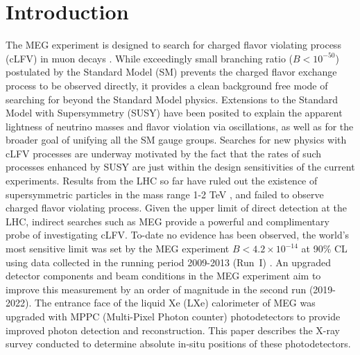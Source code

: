 \section{\label{intro}Introduction}
The MEG experiment is designed to search for charged flavor violating
\mueg process (cLFV) in muon decays \cite{megexperiment}.  While
exceedingly small branching ratio ($B < 10^{-50}$) postulated by the
Standard Model (SM) prevents the charged flavor exchange process to be
observed directly, it provides a clean background free mode of
searching for beyond the Standard Model physics.  Extensions to the
Standard Model with Supersymmetry (SUSY) have been posited to explain
the apparent lightness of neutrino masses and flavor violation via
oscillations, as well as for the broader goal of unifying all the SM
gauge groups. Searches for new physics with cLFV processes are
underway motivated by the fact that the rates of such processes
enhanced by SUSY are just within the design sensitivities of the
current experiments.  Results from the LHC so far have ruled out the
existence of supersymmetric particles in the mass range 1-2 TeV
\cite{lhcsusy1,lhcsusy2}, and failed to observe charged flavor violating
process\cite{lhcclfv1,lhcclfv2}.  Given the upper limit of
direct detection at the LHC, indirect searches such as MEG provide a
powerful and complimentary probe of investigating cLFV.  To-date no
evidence has been observed, the world’s most sensitive limit was set
by the MEG experiment $B < 4.2 \times 10^{-14}$ at 90\% CL using data
collected in the running period 2009-2013 (Run~I) \cite{meg1result}.
An upgraded detector components and beam conditions in the MEG
experiment aim to improve this measurement by an order of magnitude in
the second run (2019-2022).  The entrance face of the liquid Xe (LXe)
calorimeter of MEG was upgraded with MPPC (Multi-Pixel Photon counter)
photodetectors to provide improved photon detection and
reconstruction.  This paper describes the X-ray survey conducted to
determine absolute in-situ positions of these photodetectors.
